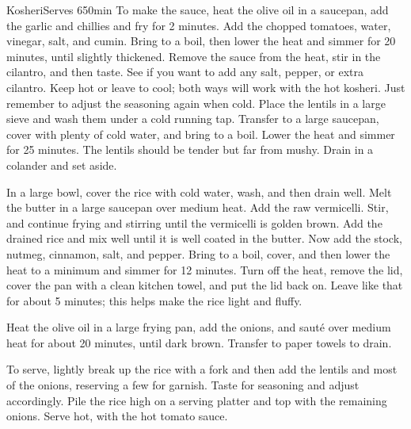 \begin{recipe}{Kosheri}{Serves 6}{50min}
To make the sauce, heat the olive oil in a saucepan, add the garlic and chillies and fry for 2 minutes. Add the chopped tomatoes, water, vinegar, salt, and cumin. Bring to a boil, then lower the heat and simmer for 20 minutes, until slightly thickened. Remove the sauce from the heat, stir in the cilantro, and then taste. See if you want to add any salt, pepper, or extra cilantro. Keep hot or leave to cool; both ways will work with the hot kosheri. Just remember to adjust the seasoning again when cold.
Place the lentils in a large sieve and wash them under a cold running tap. Transfer to a large saucepan, cover with plenty of cold water, and bring to a boil. Lower the heat and simmer for 25 minutes. The lentils should be tender but far from mushy. Drain in a colander and set aside.

In a large bowl, cover the rice with cold water, wash, and then drain well. Melt the butter in a large saucepan over medium heat. Add the raw vermicelli. Stir, and continue frying and stirring until the vermicelli is golden brown. Add the drained rice and mix well until it is well coated in the butter. Now add the stock, nutmeg, cinnamon, salt, and pepper. Bring to a boil, cover, and then lower the heat to a minimum and simmer for 12 minutes. Turn off the heat, remove the lid, cover the pan with a clean kitchen towel, and put the lid back on. Leave like that for about 5 minutes; this helps make the rice light and fluffy.

Heat the olive oil in a large frying pan, add the onions, and sauté over medium heat for about 20 minutes, until dark brown. Transfer to paper towels to drain.

To serve, lightly break up the rice with a fork and then add the lentils and most of the onions, reserving a few for garnish. Taste for seasoning and adjust accordingly. Pile the rice high on a serving platter and top with the remaining onions. Serve hot, with the hot tomato sauce.
\end{recipe}
